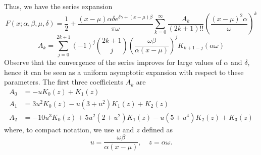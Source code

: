 \documentclass[10pt,a4paper,oneside]{article}
\numberwithin{equation}{section}
\begin{document}
Thus, we have the series expansion
\begin{equation}\label{general_expansion_xmu_small_bessel}
F(x;\alpha, \beta, \mu, \delta) = \frac{1}{2} + \frac{(x-\mu)\alpha\delta e^{\delta \gamma + (x -\mu)\beta}}{\pi \omega}\sum_{k=0}^{\infty} \frac{A_k}{(2k+1)!!}\left(\frac{(x-\mu)^2\alpha}{\omega}\right)^k
\end{equation}
\begin{equation}
A_k = \sum_{j=0}^{2k+1} (-1)^j \binom{2k+1}{j} \left(\frac{\omega \beta}{\alpha (x-\mu)}\right)^j K_{k + 1 - j}(\alpha \omega)
\end{equation}
Observe that the convergence of the series improves for large values of $\alpha$ and $\delta$, hence it can be seen as a uniform asymptotic expansion with respect to these parameters. The first three coefficients $A_k$ are
\begin{align*}
A_0 &= -u K_0(z) + K_1(z)\\
A_1 &= 3u^2 K_0(z) - u(3 + u^2) K_1(z) + K_2(z)\\
A_2 &= -10u^3 K_0(z) + 5u^2(2 + u^2) K_1(z) - u(5 + u^4) K_2(z) + K_3(z)
\end{align*}
where, to compact notation, we use $u$ and $z$ defined as
\begin{equation}
u = \frac{\omega \beta}{\alpha (x-\mu)}, \quad z = \alpha \omega.
\end{equation}
\end{document}
